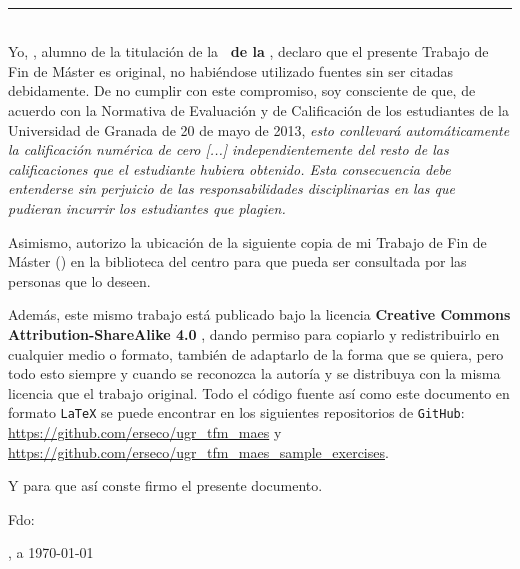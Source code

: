{{\newpage
\thispagestyle{empty}
\
\vspace{10cm}

\noindent\rule[-1ex]{\textwidth}{2pt}\\[4.5ex]


Yo, \textbf{\autor}, alumno de la titulación \textbf{\master} de la \textbf{\escuela\ de la \universidad}, declaro que el presente Trabajo de Fin de Máster es original, no habiéndose utilizado fuentes sin ser citadas debidamente. De no cumplir con este compromiso, soy consciente de que, de acuerdo con la Normativa de Evaluación y de Calificación de los estudiantes de la Universidad de Granada de 20 de mayo de 2013, \textit{esto conllevará automáticamente la calificación numérica de cero [...] independientemente del resto de las calificaciones que el estudiante hubiera obtenido. Esta consecuencia debe entenderse sin perjuicio de las responsabilidades disciplinarias en las que pudieran incurrir los estudiantes que plagien.}

\bigskip
Asimismo, autorizo la ubicación de la siguiente copia de mi Trabajo de Fin de Máster (\textit{\titulo}) en la biblioteca del centro para que pueda ser consultada por las personas que lo deseen.

\bigskip
Además, este mismo trabajo está publicado bajo la licencia \textbf{Creative Commons Attribution-ShareAlike 4.0} \cite{CC}, dando permiso para copiarlo y redistribuirlo en cualquier medio o formato, también de adaptarlo de la forma que se quiera, pero todo esto siempre y cuando se reconozca la autoría y se distribuya con la misma licencia que el trabajo original. Todo el código fuente así como este documento en formato {\tt LaTeX} se puede encontrar en los siguientes repositorios de {\tt GitHub}: \url{https://github.com/erseco/ugr_tfm_maes} y \url{https://github.com/erseco/ugr_tfm_maes_sample_exercises}.

\bigskip
Y para que así conste firmo el presente documento.

\vspace{3cm}

\noindent Fdo: \autor

\vspace{3cm}

\begin{flushright}
\ciudad, a \today
\end{flushright}

}}
